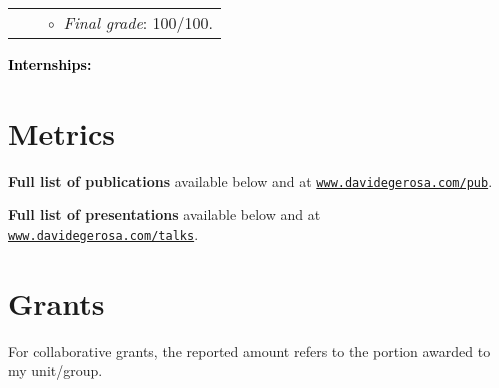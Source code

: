 \vspace{0.2cm}
\vspace{-0.1cm}
\begin{tabular}{rcl}
&\hspace{0.4cm} &$\circ\;\;${\textit{Final grade}}:  100/100.\\
\end{tabular}

\newpage{}
\textbf{\textcolor{black}{Internships:}}\vspace{0.05cm}\\
 \vspace{-0.1cm}
 \vspace{-0.1cm}




\section{Metrics}



\textbf{Full list of publications} available 
below and
at \href{http://www.davidegerosa.com/pub}{\texttt{www.davidegerosa.com/pub}}.

\vspace{0.2cm}



\textbf{Full list of presentations} available
below and
at \href{http://www.davidegerosa.com/talks}{\texttt{www.davidegerosa.com/talks}}.

\section{Grants}
For collaborative grants, the reported amount refers to the portion awarded to my unit/group. 
\vspace{0.3cm}



